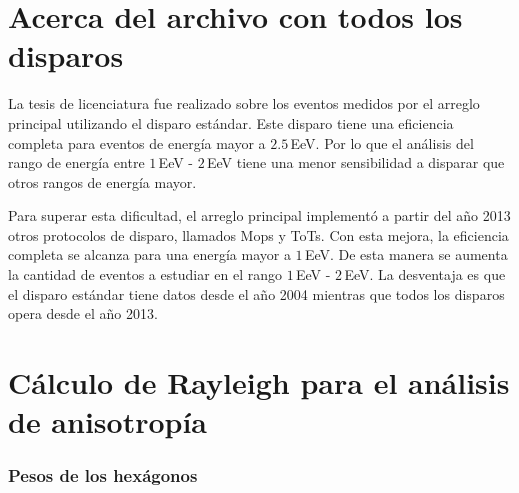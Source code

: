 \section{Acerca del archivo con todos los disparos}

La tesis de licenciatura fue realizado sobre los eventos medidos por el arreglo principal utilizando el disparo estándar. Este disparo tiene una eficiencia completa para eventos de energía mayor a $2.5\,$EeV. Por lo que el análisis del rango de energía entre $1\,$EeV - $2\,$EeV tiene una menor sensibilidad a disparar que otros rangos de energía mayor.

Para superar esta dificultad, el arreglo principal implementó a partir del año 2013 otros protocolos de disparo, llamados Mops y ToTs. Con esta mejora, la eficiencia completa se alcanza para una energía mayor a $1\,$EeV. De esta manera se aumenta la cantidad de eventos a estudiar en el rango $1\,$EeV - $2\,$EeV. La desventaja es que el disparo estándar tiene datos desde el año 2004 mientras que todos los disparos opera desde el año 2013.
   

\section{Cálculo de Rayleigh para el análisis de anisotropía}

  \subsubsection{Pesos de los hexágonos} \label{peso_hexagonos}


